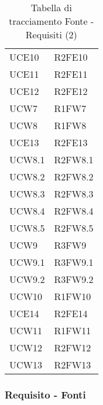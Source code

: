 \begin{table}[!htbp]
\begin{tabular}{ m{}<{\centering}  m{}<{\centering} }
	UCE10 & R2FE10 \\

	UCE11 & R2FE11\\
	 
	UCE12 & R2FE12 \\			
	 
	UCW7 & R1FW7 \\	
	 
	UCW8 & R1FW8 \\		
	
	UCE13 & R2FE13  \\	
	 
	UCW8.1 & R2FW8.1 \\	
	 
	UCW8.2 & R2FW8.2 \\	
	 
	UCW8.3 & R2FW8.3\\	
	 
	UCW8.4 & R2FW8.4 \\	 
	 
	UCW8.5 & R2FW8.5 \\	 
	 
	UCW9 & R3FW9 \\	
	 
	UCW9.1 & R3FW9.1\\	 
	 
	UCW9.2 & R3FW9.2\\	  
	 
	UCW10 & R1FW10 \\	 
	 
	UCE14 & R2FE14\\	 
	 	 
	UCW11 & R1FW11\\	 	 	 	

	UCW12 & R2FW12\\

	UCW13 & R2FW13 \\

\end{tabular}
\caption{Tabella di tracciamento Fonte - Requisiti (2)}
\end{table}

\pagebreak

\subsubsection{Requisito - Fonti}

